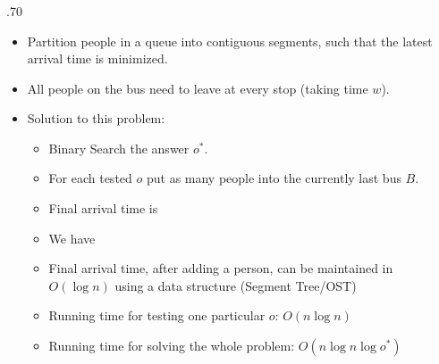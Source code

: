 \begin{frame}
    \frametitle{\problemtitle}

    \begin{columns}
        \begin{column}[T]{.70\textwidth}
            \begin{itemize}
                \item Partition people in a queue into contiguous segments, such that the latest arrival time is minimized.
                \item All people on the bus need to leave at every stop (taking time $w$).
                \pause
               \item Solution to this problem:
                \begin{itemize}
                  \item Binary Search the answer $o^*$.
                        \pause
                    \item For each tested $o$ put as many people into the currently last bus $B$.
                        \pause
                  \item Final arrival time is\\
                        \pause
                    \item We have
                        \pause
                \item Final arrival time, after adding a person, can be maintained in \(O(\log n)\) using a data structure (Segment Tree/OST)
                        \pause
                  \item Running time for testing one particular $o$: \(O(n \log n)\)
                  \item Running time for solving the whole problem: \(O(n \log n \log o^{*})\)
                \end{itemize}
            \end{itemize}


\end{column}
\end{columns}
\end{frame}
